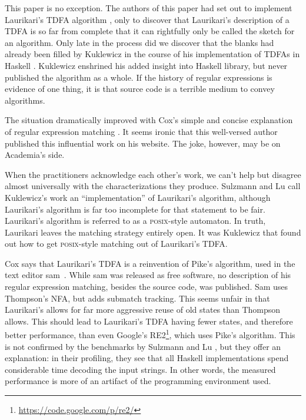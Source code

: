 \documentclass[11pt]{Thesis}
\theoremstyle{definition}
\begin{document}
This paper is no exception. The authors of this paper had set out
to implement Laurikari's TDFA algorithm \cite{Laur00a},
only to discover that Laurikari's description of a TDFA is so far
from complete that it can rightfully only be called the sketch for
an algorithm. Only late in the process did we discover that the blanks
had already been filled by Kuklewicz in the course of his implementation
of TDFAs in Haskell \cite{Kukl07a}. Kuklewicz enshrined his
added insight into Haskell library, but never published the algorithm
as a whole. If the history of regular expressions is evidence of one
thing, it is that source code is a terrible medium to convey algorithms. 

The situation dramatically improved with Cox's simple and concise
explanation of regular expression matching \cite{Cox07a}. It seems
ironic that this well-versed author published this influential work
on his website. The joke, however, may be on Academia's side.

When the practitioners acknowledge each other's work, we can't
help but disagree almost universally with the characterizations they
produce. Sulzmann and Lu \cite{Sulz12a} call Kuklewicz's
work an ``implementation'' of Laurikari's algorithm, although Laurikari's
algorithm is far too incomplete for that statement to be fair. Laurikari's
algorithm is referred to as a \textsc{posix}-style automaton. In truth, Laurikari
leaves the matching strategy entirely open. It was Kuklewicz that
found out how to get \textsc{posix}-style matching out of Laurikari's TDFA. 

Cox says that Laurikari's TDFA is a reinvention of Pike's algorithm,
used in the text editor sam~\cite{Pike87a}.  While sam was released
as free software, no description of his regular expression matching,
besides the source code, was published.  Sam uses Thompson's NFA,
but adds submatch tracking. This seems unfair in that Laurikari's
allows for far more aggressive reuse of old states than Thompson
allows. This should lead to Laurikari's TDFA having fewer states,
and therefore better performance, than even Google's
RE2\footnote{\url{https://code.google.com/p/re2/}}, which uses
Pike's algorithm.  This is not confirmed by the benchmarks by
Sulzmann and Lu \cite{Sulz12a}, but they offer an explanation: in
their profiling, they see that all Haskell implementations spend
considerable time decoding the input strings. In other words, the
measured performance is more of an artifact of the programming
environment used.
\end{document}
